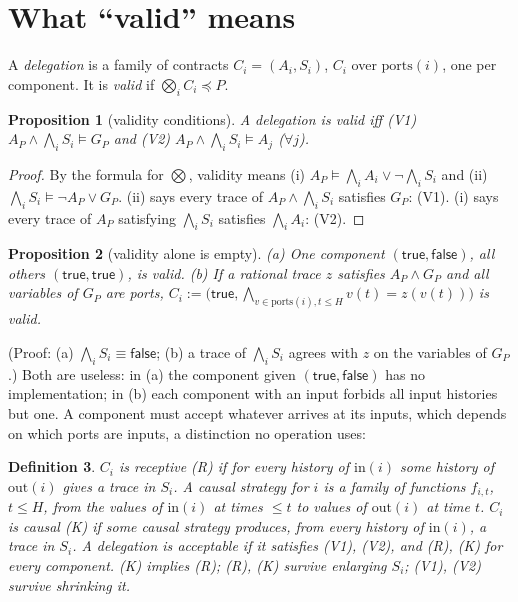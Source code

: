 \documentclass[10pt]{article}
\theoremstyle{tplain}\newtheorem{theorem}{Theorem}\newtheorem{lemma}[theorem]{Lemma}\newtheorem{proposition}[theorem]{Proposition}\newtheorem{corollary}[theorem]{Corollary}
\theoremstyle{tdef}\newtheorem{definition}[theorem]{Definition}
\newcommand{\inp}{\mathrm{in}}\newcommand{\outp}{\mathrm{out}}\newcommand{\ports}{\mathrm{ports}}
\newcommand{\TRUE}{\mathsf{true}}\newcommand{\FALSE}{\mathsf{false}}
\begin{document}
\section{What ``valid'' means}
A \emph{delegation} is a family of contracts $C_i=(A_i,S_i)$, $C_i$ over $\ports(i)$, one per component. It is \emph{valid} if $\bigotimes_iC_i\preccurlyeq P$.
\begin{proposition}[validity conditions]\label{prop:valid}
A delegation is valid iff (V1) $A_P\wedge\bigwedge_iS_i\models G_P$ and (V2) $A_P\wedge\bigwedge_iS_i\models A_j$ ($\forall j$).
\end{proposition}
\begin{proof}
By the formula for $\bigotimes$, validity means (i) $A_P\models\bigwedge_iA_i\vee\neg\bigwedge_iS_i$ and (ii) $\bigwedge_iS_i\models\neg A_P\vee G_P$. (ii) says every trace of $A_P\wedge\bigwedge_iS_i$ satisfies $G_P$: (V1). (i) says every trace of $A_P$ satisfying $\bigwedge_iS_i$ satisfies $\bigwedge_iA_i$: (V2).
\end{proof}
\begin{proposition}[validity alone is empty]\label{prop:empty}
(a) One component $(\TRUE,\FALSE)$, all others $(\TRUE,\TRUE)$, is valid. (b) If a rational trace $z$ satisfies $A_P\wedge G_P$ and all variables of $G_P$ are ports, $C_i:=\big(\TRUE,\bigwedge_{v\in\ports(i),t\le H}v(t)=z(v(t))\big)$ is valid.
\end{proposition}
(Proof: (a) $\bigwedge_iS_i\equiv\FALSE$; (b) a trace of $\bigwedge_iS_i$ agrees with $z$ on the variables of $G_P$.) Both are useless: in (a) the component given $(\TRUE,\FALSE)$ has no implementation; in (b) each component with an input forbids all input histories but one. A component must accept whatever arrives at its inputs, which depends on which ports are inputs, a distinction no operation uses:
\begin{definition}
$C_i$ is \emph{receptive} (R) if for every history of $\inp(i)$ some history of $\outp(i)$ gives a trace in $S_i$. A \emph{causal strategy} for $i$ is a family of functions $f_{i,t}$, $t\le H$, from the values of $\inp(i)$ at times $\le t$ to values of $\outp(i)$ at time $t$. $C_i$ is \emph{causal} (K) if some causal strategy produces, from every history of $\inp(i)$, a trace in $S_i$. A delegation is \emph{acceptable} if it satisfies (V1), (V2), and (R), (K) for every component. (K) implies (R); (R), (K) survive enlarging $S_i$; (V1), (V2) survive shrinking it.
\end{definition}
\end{document}

